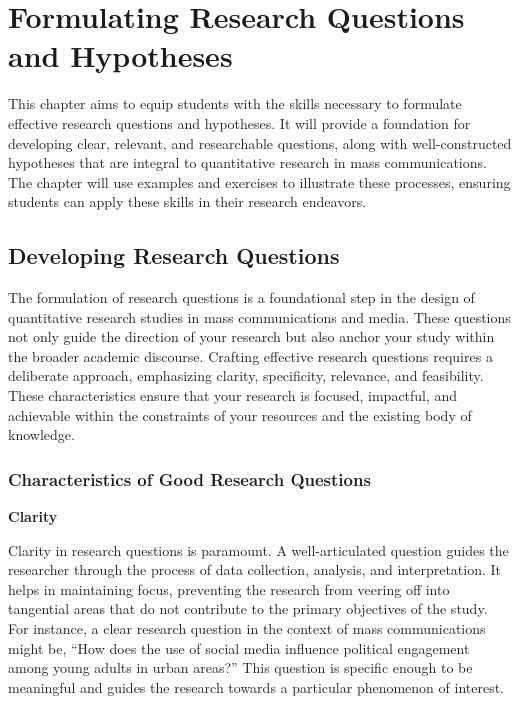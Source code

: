 \documentclass[
]{book}
\begin{document}
\hypertarget{formulating-research-questions-and-hypotheses}{%
\chapter{Formulating Research Questions and Hypotheses}\label{formulating-research-questions-and-hypotheses}}

This chapter aims to equip students with the skills necessary to formulate effective research questions and hypotheses. It will provide a foundation for developing clear, relevant, and researchable questions, along with well-constructed hypotheses that are integral to quantitative research in mass communications. The chapter will use examples and exercises to illustrate these processes, ensuring students can apply these skills in their research endeavors.

\hypertarget{developing-research-questions}{%
\section*{Developing Research Questions}\label{developing-research-questions}}

The formulation of research questions is a foundational step in the design of quantitative research studies in mass communications and media. These questions not only guide the direction of your research but also anchor your study within the broader academic discourse. Crafting effective research questions requires a deliberate approach, emphasizing clarity, specificity, relevance, and feasibility. These characteristics ensure that your research is focused, impactful, and achievable within the constraints of your resources and the existing body of knowledge.

\hypertarget{characteristics-of-good-research-questions}{%
\subsection*{Characteristics of Good Research Questions}\label{characteristics-of-good-research-questions}}

\textbf{Clarity}

Clarity in research questions is paramount. A well-articulated question guides the researcher through the process of data collection, analysis, and interpretation. It helps in maintaining focus, preventing the research from veering off into tangential areas that do not contribute to the primary objectives of the study. For instance, a clear research question in the context of mass communications might be, ``How does the use of social media influence political engagement among young adults in urban areas?'' This question is specific enough to be meaningful and guides the research towards a particular phenomenon of interest.
\end{document}
